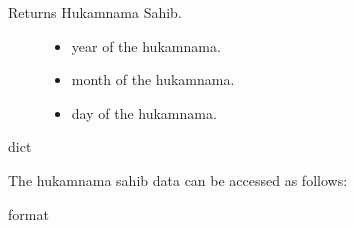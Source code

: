 \documentclass[letterpaper,10pt,english]{sphinxmanual}
\begin{document}
\begin{sphinxVerbatim}[commandchars=\\\{\}]
    
\end{sphinxVerbatim}

\sphinxAtStartPar
Returns Hukamnama Sahib.
\begin{description}
\item[{}] \leavevmode\begin{itemize}
\item {} 
\sphinxAtStartPar
{}  \textendash{}  year of the hukamnama.

\item {} 
\sphinxAtStartPar
{}  \textendash{}  month of the hukamnama.

\item {} 
\sphinxAtStartPar
{}  \textendash{}  day of the hukamnama.

\end{itemize}

\end{description}

\sphinxAtStartPar
{}    dict

\begin{DUlineblock}{0em}
\item[] 
\item[] The hukamnama sahib data can be accessed as follows:
\end{DUlineblock}

\begin{sphinxVerbatim}[commandchars=\\\{\}]
    \PYG{p}{[}\PYG{p}{]} 
\end{sphinxVerbatim}

\sphinxAtStartPar
{} format
\end{document}
